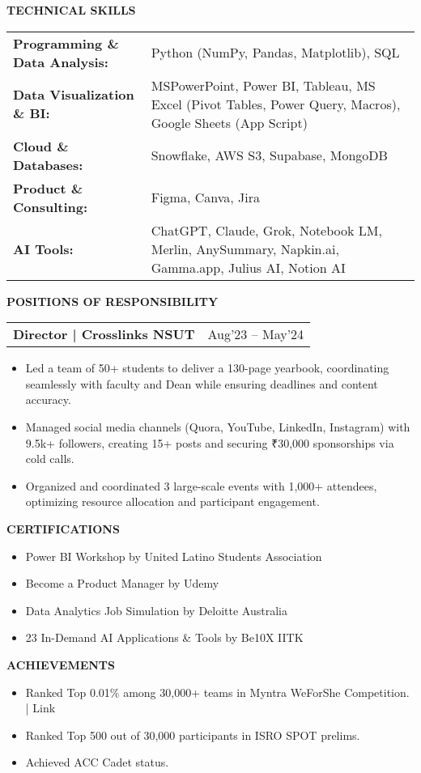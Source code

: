 \documentclass[a4paper]{article}
\makeatletter
\newcommand{\resumesubheading}[3]{
    \vspace{0em}
    \begin{tabularx}{\textwidth}{@{}X r@{}}
        \textbf{#1 | #2} & #3 \\
    \end{tabularx}
    \vspace{-0.2em}
}
\newcommand{\resumeitem}[1]{\item #1}
\makeatother
\begin{document}
\begin{sectionbox}\textbf{TECHNICAL SKILLS}\end{sectionbox}
\vspace{0em}
\begin{tabularx}{\textwidth}{@{}>{\bfseries}l X@{}}
    Programming \& Data Analysis: & Python (NumPy, Pandas, Matplotlib), SQL \\
    Data Visualization \& BI: & MSPowerPoint, Power BI, Tableau, MS Excel (Pivot Tables, Power Query, Macros), Google Sheets (App Script) \\
    Cloud \& Databases: & Snowflake, AWS S3, Supabase, MongoDB \\
    Product \& Consulting: & Figma, Canva, Jira \\
    AI Tools: & ChatGPT, Claude, Grok, Notebook LM, Merlin, AnySummary, Napkin.ai, Gamma.app, Julius AI, Notion AI \\
\end{tabularx}

\begin{sectionbox}\textbf{POSITIONS OF RESPONSIBILITY}\end{sectionbox}
\resumesubheading{Director}{Crosslinks NSUT}{Aug'23 -- May'24}
\begin{itemize}
    \resumeitem{Led a team of 50+ students to deliver a 130-page yearbook, coordinating seamlessly with faculty and Dean while ensuring deadlines and content accuracy.}
    \resumeitem{Managed social media channels (Quora, YouTube, LinkedIn, Instagram) with 9.5k+ followers, creating 15+ posts and securing ₹30,000 sponsorships via cold calls.}
    \resumeitem{Organized and coordinated 3 large-scale events with 1,000+ attendees, optimizing resource allocation and participant engagement.}
\end{itemize}

\begin{sectionbox}\textbf{CERTIFICATIONS}\end{sectionbox}
\vspace{0em}
\begin{itemize}
    \resumeitem{Power BI Workshop by United Latino Students Association}
    \resumeitem{Become a Product Manager by Udemy}
    \resumeitem{Data Analytics Job Simulation by Deloitte Australia}
    \resumeitem{23 In-Demand AI Applications \& Tools by Be10X IITK}
\end{itemize}

\begin{sectionbox}\textbf{ACHIEVEMENTS}\end{sectionbox}
\vspace{0em}
\begin{itemize}
    \resumeitem{Ranked Top 0.01\% among 30,000+ teams in Myntra WeForShe Competition. | Link}
    \resumeitem{Ranked Top 500 out of 30,000 participants in ISRO SPOT prelims.}
    \resumeitem{Achieved ACC Cadet status.}
\end{itemize}
\end{document}
